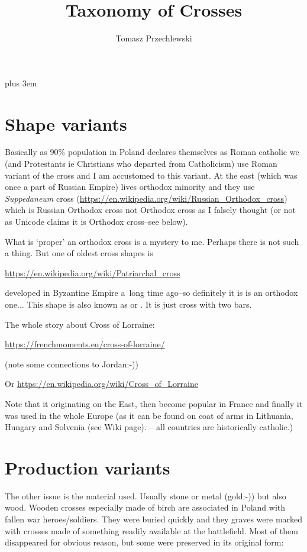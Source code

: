 \documentclass[a4page]{article}
\title{Taxonomy of Crosses}
\author{Tomasz Przechlewski}
\begin{document}
\maketitle
{} plus 3em

\section{Shape variants}

Basically as 90\% population in Poland declares themselves as Roman
catholic we (and Protestants ie Christians who departed from
Catholicism) use Roman variant of the cross and I am accustomed to this
variant.  At the east (which was once a part of Russian Empire) lives
orthodox minority and they use \emph{Suppedaneum\/} cross
(\url{https://en.wikipedia.org/wiki/Russian_Orthodox_cross}) which is
Russian Orthodox cross not Orthodox cross as I falsely thought (or not
as Unicode claims it is Orthodox cross--see below).

What is `proper' an orthodox cross is a mystery to me.
Perhaps there is not such a thing. But one of oldest cross shapes is

\url{https://en.wikipedia.org/wiki/Patriarchal_cross}

developed in Byzantine Empire a~long time ago--so definitely it is 
is an orthodox one... This shape is also known
as  or .
It is just cross with two bars.

The whole story about Cross of Lorraine:

\url{https://frenchmoments.eu/cross-of-lorraine/}

(note some connections to Jordan:-))

Or \url{https://en.wikipedia.org/wiki/Cross_of_Lorraine}

Note that it originating on the East, then become popular in France
and finally it was used in the whole Europe (as it can be found 
on coat of arms in Lithuania, Hungary
and Solvenia (see Wiki page). -- all countries are historically catholic.)

\section{Production variants}

The other issue is the material used. Usually stone or metal (gold:-)) but
also wood. Wooden crosses especially made of birch are associated in Poland
with fallen war heroes/soldiers. They were buried quickly 
and they graves were marked with crosses made of something readily available at the
battlefield. Most of them disappeared for obvious reason, 
but some were preserved in its original form:
\end{document}
